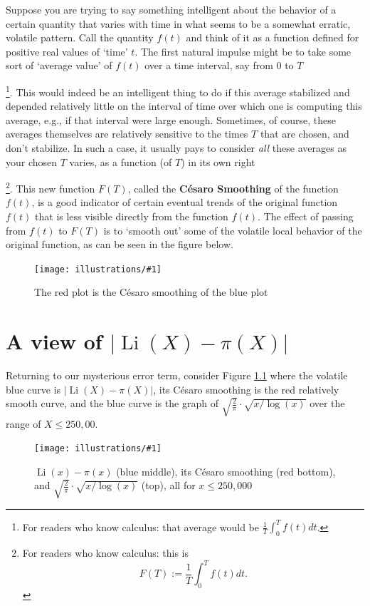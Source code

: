 \documentclass[openany]{book}
\DeclareMathOperator{\Li}{Li}
\newcommand{\ill}[3]{%
   \begin{figure}[H]%
   \vspace{-2ex}
   \centering%
   \texttt{[image: illustrations/\#1]}%
   \caption{#3}%
   \vspace{-2ex}
    \end{figure}}
\theoremstyle{plain}
\theoremstyle{definition}
\begin{document}
 Suppose you are trying to say something intelligent about the behavior of a certain quantity that varies with time in what seems to be a somewhat erratic, volatile pattern. Call the quantity $f(t)$ and think of it as a function defined for positive real values of `time' $t$.  The first natural impulse might be to take some sort of `average value' of  $f(t)$ over a time interval, say from $0$ to $T${\footnote{ For readers who know calculus: that  average would be ${\frac{1}{T}}\int_0^Tf(t)dt$.}.   This would indeed be an intelligent thing to do if this average stabilized and depended relatively little on  the interval of time over which one is computing this average, e.g., if that interval were large enough.  Sometimes, of course, these averages themselves are relatively sensitive to the times $T$ that are chosen, and don't stabilize. In such a case, it usually pays to consider {\it all} these averages  as  your chosen $T$ varies, as a function (of $T$) in its own right{\footnote{ For readers who know calculus: this is
  $$F(T):= {\frac{1}{T}}\int_0^Tf(t)dt.$$}.
   This new function $F(T)$, called the {\bf C{\'e}saro Smoothing} of the function $f(t)$, is a good indicator of certain eventual trends of the original function $f(t)$ that is less visible directly from the function $f(t)$.  The effect of passing from $f(t)$ to $F(T)$ is to `smooth out' some of the volatile local behavior of the original function, as can be seen in the figure below.


\ill{cesaro}{.8}{The red plot is the C{\'e}saro smoothing of the blue plot}
\chapter{ A view of $|\Li(X) - \pi(X)|$}
 Returning to our mysterious error term,  consider Figure \ref{fig:li-minus-pi-250000} where the volatile blue curve is $|\Li(X) - \pi(X)|$, its C{\'e}saro smoothing is the red relatively smooth curve, and the blue curve is the graph of $\sqrt{\frac{2}{\pi}}\cdot \sqrt{x/\log(x)}$ over the range of $X\le 250,00$.

\ill{li-minus-pi-250000}{.9}{$\Li(x)-\pi(x)$ (blue middle), its C{\'e}saro smoothing (red bottom), and
$\sqrt{\frac{2}{\pi}}\cdot \sqrt{x/\log(x)}$ (top), all for $x\leq 250{,}000$\label{fig:li-minus-pi-250000}}

}}
\end{document}
